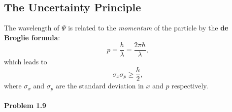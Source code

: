 \documentclass{article}
\begin{document}
\subsection{The Uncertainty Principle}

The wavelength of $\Psi$ is related to the \emph{momentum} of the particle by
the \textbf{de Broglie formula}:
\begin{equation}
  p = \frac{h}{\lambda} = \frac{2\pi\hbar}{\lambda}, \label{eq:de-brog}
\end{equation}
which leads to
\begin{equation}
  \sigma_x \sigma_p \geq \frac{\hbar}{2},
\end{equation}
where $\sigma_x$ and $\sigma_p$ are the standard deviation in $x$ and $p$
respectively.

\paragraph{Problem 1.9}
\end{document}
